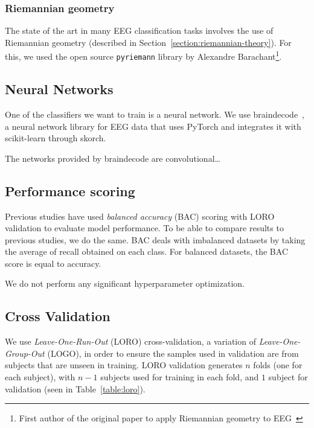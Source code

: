         \subsubsection{Riemannian geometry}

            The state of the art in many EEG classification tasks involves the use of Riemannian geometry (described in Section~\ref{section:riemannian-theory}). For this, we used the open source \texttt{pyriemann} library by Alexandre Barachant\footnote{First author of the original paper to apply Riemannian geometry to EEG~\cite{barachant_classification_2013}}.

    \subsection{Neural Networks}

        One of the classifiers we want to train is a neural network. We use braindecode~\cite{schirrmeister_deep_2017}\cite{noauthor_braindecode_2021}, a neural network library for EEG data that uses PyTorch and integrates it with scikit-learn through skorch.

        The networks provided by braindecode are convolutional\ldots

    \subsection{Performance scoring}

        Previous studies have used \emph{balanced accuracy} (BAC) scoring with LORO validation to evaluate model performance. To be able to compare results to previous studies, we do the same. BAC deals with imbalanced datasets by taking the average of recall obtained on each class. For balanced datasets, the BAC score is equal to accuracy.

        We do not perform any significant hyperparameter optimization.

    \subsection{Cross Validation}

        We use \emph{Leave-One-Run-Out} (LORO) cross-validation, a variation of \emph{Leave-One-Group-Out} (LOGO), in order to ensure the samples used in validation are from subjects that are unseen in training. LORO validation generates $n$ folds (one for each subject), with $n-1$ subjects used for training in each fold, and $1$ subject for validation (seen in Table~\ref{table:loro}).

